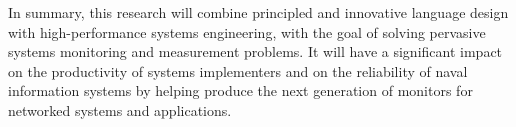
In summary, this research will combine principled and innovative
language design with high-performance systems engineering, with the
goal of solving pervasive systems monitoring and measurement problems.
It will have a significant impact on the
productivity of systems implementers and on the reliability of
naval information systems by helping produce the next
generation of monitors for networked systems and applications.



